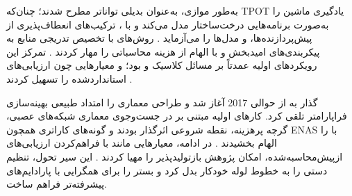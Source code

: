 به‌طور موازی،  به‌عنوان بدیلی تواناتر مطرح شدند؛ چنان‌که TPOT  یادگیری ماشین را به‌صورت برنامه‌هایی درخت‌ساختار مدل می‌کند و با ، ترکیب‌های انعطاف‌پذیری از پیش‌پردازنده‌ها،  و مدل‌ها را می‌آزماید \cite{pmlr-v64-olson_tpot_2016}. روش‌های  با تخصیص تدریجی منابع به پیکربندی‌های امیدبخش و با الهام از  هزینه محاسباتی را مهار کردند \cite{pmlr-v51-jamieson16, JMLR:v18:16-558}. تمرکز این رویکردهای اولیه عمدتاً بر مسائل کلاسیک  و  بود؛ و معیارهایی چون  ارزیابی‌های استانداردشده را تسهیل کردند \cite{bischl2021openmlbenchmarkingsuites}.

گذار به  از حوالی 2017 آغاز شد و طراحی معماری را امتداد طبیعی بهینه‌سازی فراپارامتر تلقی کرد. کارهای اولیه مبتنی بر  در جست‌وجوی معماری شبکه‌های عصبی، گرچه پرهزینه، نقطه شروعی اثرگذار بودند و گونه‌های کاراتری همچون ENAS با  را الهام بخشیدند \cite{zoph2017neural, pmlr-v80-pham18a}. در ادامه، معیارهایی مانند  با فراهم‌کردن ارزیابی‌های ازپیش‌محاسبه‌شده، امکان پژوهش بازتولیدپذیر را مهیا کردند \cite{pmlr-v97-ying19a}. این سیر تحول، تنظیم دستی را به خطوط لوله خودکار بدل کرد و بستر را برای همگرایی با پارادایم‌های پیشرفته‌تر فراهم ساخت.